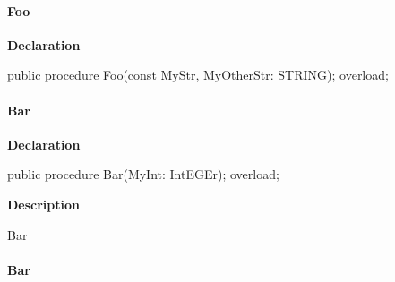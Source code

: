 \documentclass{report}
\begin{document}
\paragraph*{Foo}\hspace*{\fill}

\begin{list}{}{
\setlength{\itemindent}{0cm}
\setlength{\listparindent}{0cm}
\setlength{\leftmargin}{\evensidemargin}
\addtolength{\leftmargin}{\tmplength}
\settowidth{\labelsep}{X}
\addtolength{\leftmargin}{\labelsep}
\setlength{\labelwidth}{\tmplength}
}
\begin{flushleft}
\item[\textbf{Declaration}\hfill]
\begin{ttfamily}
public procedure Foo(const MyStr, MyOtherStr: STRING); overload;\end{ttfamily}


\end{flushleft}
\end{list}
\paragraph*{Bar}\hspace*{\fill}

\begin{list}{}{
\setlength{\itemindent}{0cm}
\setlength{\listparindent}{0cm}
\setlength{\leftmargin}{\evensidemargin}
\addtolength{\leftmargin}{\tmplength}
\settowidth{\labelsep}{X}
\addtolength{\leftmargin}{\labelsep}
\setlength{\labelwidth}{\tmplength}
}
\begin{flushleft}
\item[\textbf{Declaration}\hfill]
\begin{ttfamily}
public procedure Bar(MyInt: IntEGEr); overload;\end{ttfamily}


\end{flushleft}
\par
\item[\textbf{Description}]
\begin{ttfamily}Bar\end{ttfamily}

\end{list}
\paragraph*{Bar}\hspace*{\fill}
\end{document}
